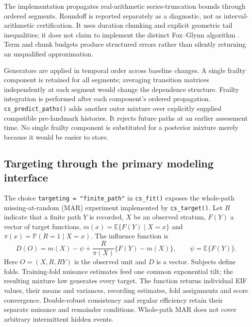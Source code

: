 \documentclass[article,nojss]{jss}
\newcommand{\code}[1]{\texttt{#1}}
\providecommand{\E}{\mathsf{E}}
\renewcommand{\E}{\mathbb{E}}
\newcommand{\Prb}{\mathbb{P}}
\begin{document}
The implementation propagates real-arithmetic series-truncation bounds through ordered segments. Roundoff is reported separately as a diagnostic, not as interval-arithmetic certification. It uses duration chunking and explicit geometric tail inequalities; it does not claim to implement the distinct Fox--Glynn algorithm \citep{Fox1988}. Term and chunk budgets produce structured errors rather than silently returning an unqualified approximation.

Generators are applied in temporal order across baseline changes. A single frailty component is retained for all segments; averaging transition matrices independently at each segment would change the dependence structure. Frailty integration is performed after each component's ordered propagation. \code{cs\_predict\_paths()} adds another outer mixture over explicitly supplied compatible pre-landmark histories. It rejects future paths at an earlier assessment time. No single frailty component is substituted for a posterior mixture merely because it would be easier to store.

\subsection{Targeting through the primary modeling interface}
The choice \code{targeting = "finite\_path"} in \code{cs\_fit()} exposes the whole-path missing-at-random (MAR) experiment implemented by \code{cs\_target()}. Let $R$ indicate that a finite path $Y$ is recorded, $X$ be an observed stratum, $F(Y)$ a vector of target functions, $m(x)=\E\{F(Y)\mid X=x\}$ and $\pi(x)=\Prb(R=1\mid X=x)$. The influence function is
\begin{equation}\label{eq:eif}
D(O)=m(X)-\psi+\frac{R}{\pi(X)}\{F(Y)-m(X)\},\qquad
\psi=\E\{F(Y)\}.
\end{equation}
Here $O=(X,R,RY)$ is the observed unit and $D$ is a vector. Subjects define folds. Training-fold nuisance estimates feed one common exponential tilt; the resulting mixture law generates every target. The function returns individual EIF values, their means and variances, recording estimates, fold assignments and score convergence. Double-robust consistency and regular efficiency retain their separate nuisance and remainder conditions. Whole-path MAR does not cover arbitrary intermittent hidden events.
\end{document}
